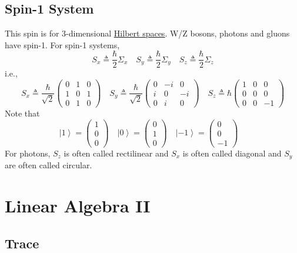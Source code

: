 \documentclass[
]{article}
\let\oldhyperref\hyperref
\renewcommand{\hyperref}[2][]{\oldhyperref[#1]{\underline{#2}}}
\providecommand{\ket}[1]{\left\lvert #1 \right\rangle}
\begin{document}
\subsection{Spin-1 System}\label{spin-1-systems}
This spin is for 3-dimensional \hyperref[hilbert-spaces]{Hilbert spaces}.
W/Z bosons, photons and gluons have spin-1.
For spin-1 systems,
\[
	S_x\triangleq\frac{\hbar}{2}\Sigma_x\quad
	S_y\triangleq\frac{\hbar}{2}\Sigma_y\quad
	S_z\triangleq\frac{\hbar}{2}\Sigma_z
\]
i.e.,
\[
	S_x\triangleq\frac{\hbar}{\sqrt{2}}\begin{pmatrix}0 & 1 & 0\\ 1 & 0 & 1\\ 0 & 1 & 0\end{pmatrix}\quad
	S_y\triangleq\frac{\hbar}{\sqrt{2}}\begin{pmatrix}0 & -i & 0\\ i & 0 & -i\\ 0 & i & 0\end{pmatrix}\quad
	S_z\triangleq\hbar\begin{pmatrix}1 & 0 & 0\\ 0 & 0 & 0\\ 0 & 0 & -1\end{pmatrix}
\]
Note that
\[
	\ket{1}=\begin{pmatrix}1 \\ 0 \\ 0\end{pmatrix}\quad
	\ket{0}=\begin{pmatrix}0 \\ 1 \\ 0\end{pmatrix}\quad
	\ket{-1}=\begin{pmatrix}0 \\ 0 \\ -1\end{pmatrix}\quad
\]
For photons, $S_z$ is often called rectilinear and $S_x$ is often called diagonal and $S_y$ are often called circular.



\section{Linear Algebra II}\label{linear-algebra-ii}



\subsection{Trace}\label{traces}
\end{document}
